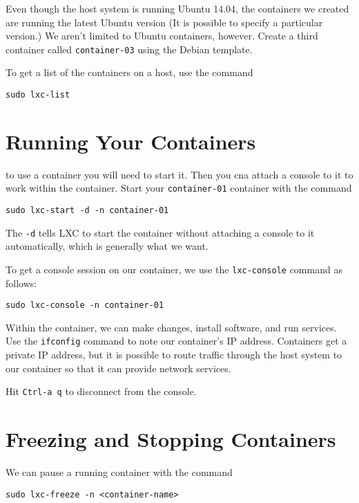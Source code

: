 \documentclass{article}
\begin{document}
Even though the host system is running Ubuntu 14.04, the containers we created are running the latest Ubuntu version (It is possible to specify a particular version.) We aren't limited to Ubuntu containers, however.  Create a third container called \texttt{container-03} using the Debian template.

To get a list of the containers on a host, use the command

\begin{verbatim}
sudo lxc-list
\end{verbatim}

\section{Running Your Containers}
to use a container you will need to start it.  Then you cna attach a console to it to work within the container.  Start your \texttt{container-01} container with the command

\begin{verbatim}
sudo lxc-start -d -n container-01
\end{verbatim}

The \texttt{-d} tells LXC to start the container without attaching a console to it automatically, which is generally what we want.

To get a console session on our container, we use the \texttt{lxc-console} command as follows:

\begin{verbatim}
sudo lxc-console -n container-01
\end{verbatim}

Within the container, we can make changes, install software, and run services. Use the \texttt{ifconfig} command to note our container's IP address. Containers get a private IP address, but it is possible to route traffic through the host system to our container so that it can provide network services.

Hit \texttt{Ctrl-a q} to disconnect from the console.

\section{Freezing and Stopping Containers}

We can pause a running container with the command 

\begin{verbatim}
sudo lxc-freeze -n <container-name>
\end{verbatim} 
\end{document}
